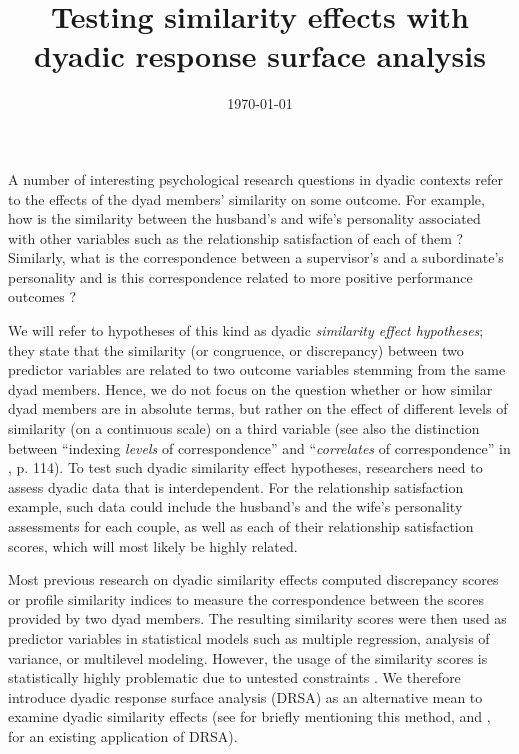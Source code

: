 \documentclass[jou,a4paper,draftfirst]{apa6}
\title{Testing similarity effects with dyadic response surface analysis}
\date{\today}
\newcommand{\added}[1]{#1}
\begin{document}
\maketitle	%
A number of interesting psychological research questions in dyadic contexts refer to the effects of the dyad members’ similarity on some outcome. For example, how is the similarity between the husband's and wife’s personality associated with other variables such as the relationship satisfaction of each of them \parencite[e.g.,][]{DyrenforthEtAl2010}? Similarly, what is the correspondence between a supervisor’s and a subordinate’s personality and is this correspondence related to more positive performance outcomes \parencite[e.g.,][]{Strauss2001}? 

We will refer to hypotheses of this kind as dyadic \textit{similarity effect hypotheses}; they state that the similarity (or congruence, or discrepancy) between two predictor variables are related to two outcome variables stemming from the same dyad members. Hence, we do not focus on the question whether or how similar dyad members are in absolute terms, but rather on the effect of different levels of similarity (on a continuous scale) on a third variable \added{(see also the distinction between ``indexing \textit{levels} of correspondence'' and ``\textit{correlates} of correspondence'' in \nptextcite{Rogers_Wood_Furr_2018}, p. 114)}. To test such dyadic similarity effect hypotheses, researchers need to assess dyadic data that is interdependent. For the relationship satisfaction example, such data could include the husband's and the wife's personality assessments for each couple, as well as each of their relationship satisfaction scores, which will most likely be highly related.

Most previous research on dyadic similarity effects computed discrepancy scores or profile similarity indices to measure the correspondence between the scores provided by two dyad members. The resulting similarity scores were then used as predictor variables in statistical models such as multiple regression, analysis of variance, or multilevel modeling. However, the usage of the similarity scores is statistically highly problematic due to untested constraints \parencite[e.g.,][]{Edwards2001}. We therefore introduce dyadic response surface analysis (DRSA) as an alternative mean to examine dyadic similarity effects (see  for briefly mentioning this method, and , for an existing application of DRSA).
\end{document}

